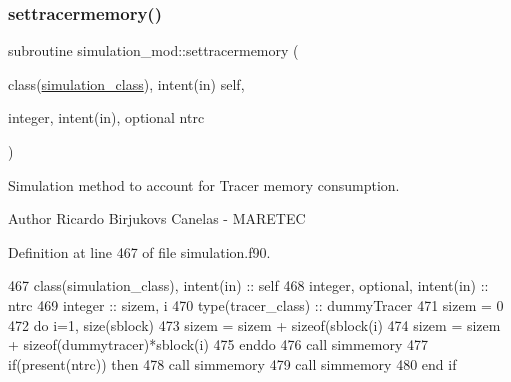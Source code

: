 \subsubsection{\texorpdfstring{settracermemory()}{settracermemory()}}
{\footnotesize\ttfamily subroutine simulation\+\_\+mod\+::settracermemory (\begin{DoxyParamCaption}\item[{class(\mbox{\hyperlink{structsimulation__mod_1_1simulation__class}{simulation\+\_\+class}}), intent(in)}]{self,  }\item[{integer, intent(in), optional}]{ntrc }\end{DoxyParamCaption})\hspace{0.3cm}{\ttfamily [private]}}



Simulation method to account for Tracer memory consumption. 

\begin{DoxyAuthor}{Author}
Ricardo Birjukovs Canelas -\/ M\+A\+R\+E\+T\+EC 
\end{DoxyAuthor}


Definition at line 467 of file simulation.\+f90.


\begin{DoxyCode}
467     \textcolor{keywordtype}{class}(simulation\_class), \textcolor{keywordtype}{intent(in)} :: self
468     \textcolor{keywordtype}{integer}, \textcolor{keywordtype}{optional}, \textcolor{keywordtype}{intent(in)} :: ntrc
469     \textcolor{keywordtype}{integer} :: sizem, i
470     \textcolor{keywordtype}{type}(tracer\_class) :: dummyTracer
471     sizem = 0
472     \textcolor{keywordflow}{do} i=1, \textcolor{keyword}{size}(sblock)
473         sizem = sizem + sizeof(sblock(i)%
474         sizem = sizem + sizeof(dummytracer)*sblock(i)%
475 \textcolor{keywordflow}{    enddo}
476     \textcolor{keyword}{call }simmemory%
477     \textcolor{keywordflow}{if}(\textcolor{keyword}{present}(ntrc)) \textcolor{keywordflow}{then}
478         \textcolor{keyword}{call }simmemory%
479         \textcolor{keyword}{call }simmemory%
480 \textcolor{keywordflow}{    end if}
\end{DoxyCode}
\mbox{\label{namespacesimulation__mod_a87a5141e4516b9610a6e4f0d2ff2d719}} 
